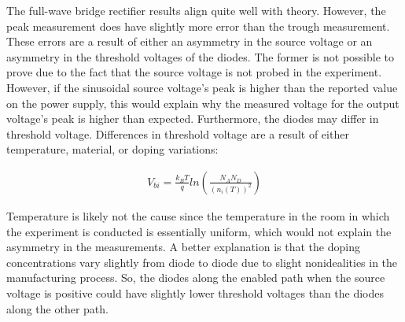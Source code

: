 The full-wave bridge rectifier results align quite well with theory. However, the peak measurement does have slightly more error than the trough measurement. These errors are a result of either an asymmetry in the source voltage or an asymmetry in the threshold voltages of the diodes. The former is not possible to prove due to the fact that the source voltage is not probed in the experiment. However, if the sinusoidal source voltage's peak is higher than the reported value on the power supply, this would explain why the measured voltage for the output voltage's peak is higher than expected. Furthermore, the diodes may differ in threshold voltage. Differences in threshold voltage are a result of either temperature, material, or doping variations:

\begin{align*}
	\label{eq:vbi}
	V_{bi} = \frac{k_BT}{q} ln( \frac{N_AN_D}{(n_{i}(T))^2} )
\end{align*}

Temperature is likely not the cause since the temperature in the room in which the experiment is conducted is essentially uniform, which would not explain the asymmetry in the measurements. A better explanation is that the doping concentrations vary slightly from diode to diode due to slight nonidealities in the manufacturing process. So, the diodes along the enabled path when the source voltage is positive could have slightly lower threshold voltages than the diodes along the other path.
